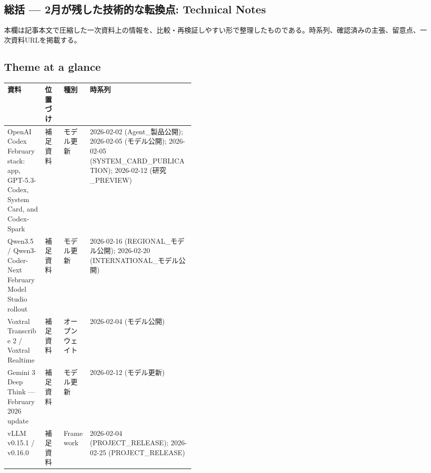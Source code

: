 \subsection*{総括 — 2月が残した技術的な転換点: Technical Notes}
本欄は記事本文で圧縮した一次資料上の情報を、比較・再検証しやすい形で整理したものである。時系列、確認済みの主張、留意点、一次資料URLを掲載する。
\medskip
\subsection*{Theme at a glance}
\begin{center}
\footnotesize
\begin{tabularx}{\linewidth}{@{}p{0.20\linewidth}p{0.10\linewidth}p{0.14\linewidth}X@{}}
\toprule
資料 & 位置づけ & 種別 & 時系列 \\
\midrule
OpenAI Codex February stack: app, GPT-5.3-Codex, System Card, and Codex-Spark & 補足資料 & モデル更新 & 2026-02-02 (Agent\_製品公開); 2026-02-05 (モデル公開); 2026-02-05 (SYSTEM\_CARD\_PUBLICATION); 2026-02-12 (研究\_PREVIEW) \\
Qwen3.5 / Qwen3-Coder-Next February Model Studio rollout & 補足資料 & モデル更新 & 2026-02-16 (REGIONAL\_モデル公開); 2026-02-20 (INTERNATIONAL\_モデル公開) \\
Voxtral Transcribe 2 / Voxtral Realtime & 補足資料 & オープンウェイト & 2026-02-04 (モデル公開) \\
Gemini 3 Deep Think — February 2026 update & 補足資料 & モデル更新 & 2026-02-12 (モデル更新) \\
vLLM v0.15.1 / v0.16.0 & 補足資料 & Framework & 2026-02-04 (PROJECT\_RELEASE); 2026-02-25 (PROJECT\_RELEASE) \\
\bottomrule
\end{tabularx}
\end{center}
\normalsize

